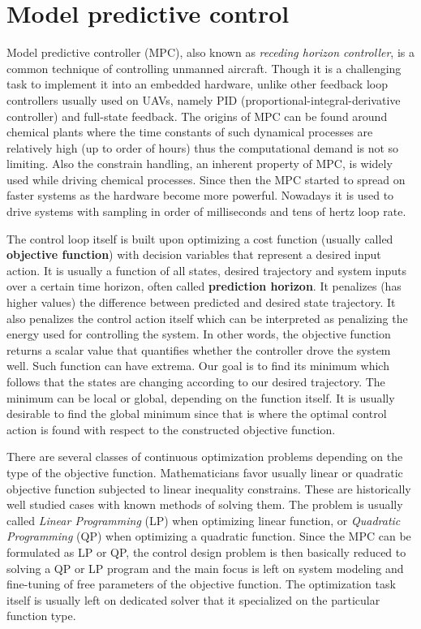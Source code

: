 \section{Model predictive control}

Model predictive controller (MPC), also known as \textit{receding horizon controller}, is a common technique of controlling unmanned aircraft. Though it is a challenging task to implement it into an embedded hardware, unlike other feedback loop controllers usually used on UAVs, namely PID (proportional-integral-derivative controller) and full-state feedback. The origins of MPC can be found around chemical plants where the time constants of such dynamical processes are relatively high (up to order of hours) thus the computational demand is not so limiting. Also the constrain handling, an inherent property of MPC, is widely used while driving chemical processes. Since then the MPC started to spread on faster systems as the hardware become more powerful. Nowadays it is used to drive systems with sampling in order of milliseconds and tens of hertz loop rate.

The control loop itself is built upon optimizing a cost function (usually called \textbf{objective function}) with decision variables that represent a desired input action. It is usually a function of all states, desired trajectory and system inputs over a certain time horizon, often called \textbf{prediction horizon}. It penalizes (has higher values) the difference between predicted and desired state trajectory. It also penalizes the control action itself which can be interpreted as penalizing the energy used for controlling the system. In other words, the objective function returns a scalar value that quantifies whether the controller drove the system well. Such function can have extrema. Our goal is to find its minimum which follows that the states are changing according to our desired trajectory. The minimum can be local or global, depending on the function itself. It is usually desirable to find the global minimum since that is where the optimal control action is found with respect to the constructed objective function.

There are several classes of continuous optimization problems depending on the type of the objective function. Mathematicians favor usually linear or quadratic objective function subjected to linear inequality constrains. These are historically well studied cases with known methods of solving them. The problem is usually called \textit{Linear Programming} (LP) when optimizing linear function, or \textit{Quadratic Programming} (QP) when optimizing a quadratic function. Since the MPC can be formulated as LP or QP, the control design problem is then basically reduced to solving a QP or LP program and the main focus is left on system modeling and fine-tuning of free parameters of the objective function. The optimization task itself is usually left on dedicated solver that it specialized on the particular function type. 

